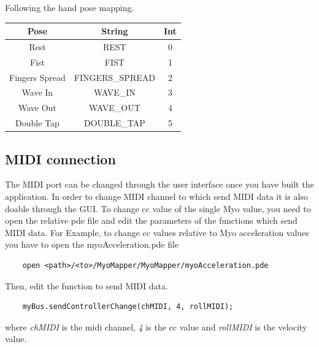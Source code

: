\documentclass[12pt,a4paper]{article}
\begin{document}
	Following the hand pose mapping. \\
	
	\begin{tabular}{|c|c|c|}\hline
		\textbf{Pose}  & \textbf{String} & \textbf{Int} \\ \hline
		Rest           & REST            & 0 \\ \hline
		Fist           & FIST            & 1 \\ \hline
		Fingers Spread & FINGERS\_SPREAD  & 2 \\ \hline
		Wave In        & WAVE\_IN         & 3 \\ \hline
		Wave Out       & WAVE\_OUT        & 4 \\ \hline
		Double Tap     & DOUBLE\_TAP      & 5 \\ \hline
	\end{tabular}  
	
	\subsection{MIDI connection}
	
	The MIDI port can be changed through the user interface once you have built the application. In order to change MIDI channel to which send MIDI data it is also doable through the GUI. To change cc value of the single Myo value, you need to open the relative pde file and edit the parameters of the functions which send MIDI data. For Example, to change cc values relative to Myo acceleration values you have to open the myoAcceleration.pde file
	\begin{verbatim}
	open <path>/<to>/MyoMapper/MyoMapper/myoAcceleration.pde
	\end{verbatim}
	
	Then, edit the function to send MIDI data.
	\begin{verbatim}
	myBus.sendControllerChange(chMIDI, 4, rollMIDI);
	\end{verbatim}
	
	where \textit{chMIDI} is the midi channel, \textit{4} is the cc value and \textit{rollMIDI} is the velocity value.
	
\end{document}
